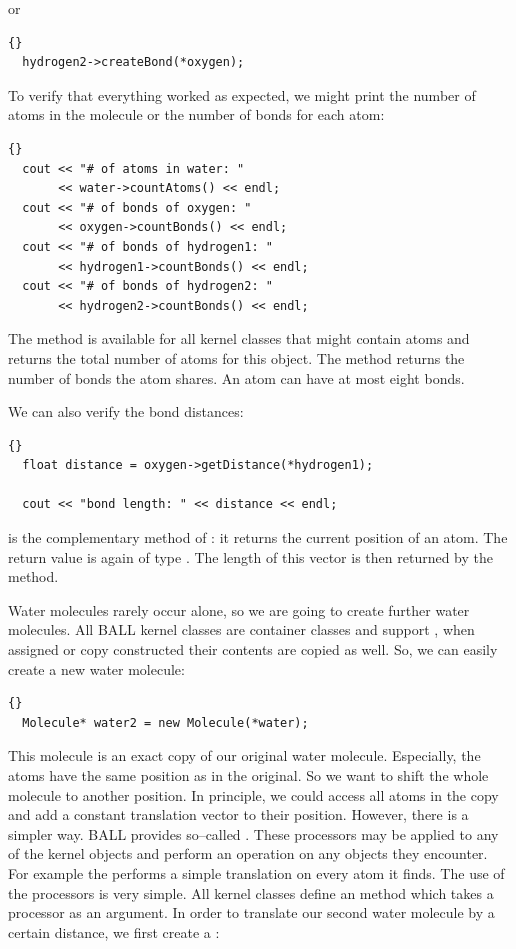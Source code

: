 or

\begin{lstlisting}{}
  hydrogen2->createBond(*oxygen);
\end{lstlisting}

\noindent
To verify that everything worked as expected, we might print the number of
atoms in the molecule or the number of bonds for each atom:
	
\begin{lstlisting}{}
  cout << "# of atoms in water: " 
       << water->countAtoms() << endl;
  cout << "# of bonds of oxygen: " 
       << oxygen->countBonds() << endl;
  cout << "# of bonds of hydrogen1: " 
       << hydrogen1->countBonds() << endl;
  cout << "# of bonds of hydrogen2: " 
       << hydrogen2->countBonds() << endl;
\end{lstlisting}

\noindent
The method  is available for all kernel classes that might
contain atoms and returns the total number of atoms for this object. The
method  returns the number of bonds the atom shares. An
atom can have at most eight bonds.

We can also verify the bond distances:
\begin{lstlisting}{}
  float distance = oxygen->getDistance(*hydrogen1);

  cout << "bond length: " << distance << endl;
\end{lstlisting}
	
\noindent
{} is the complementary method of : it
returns the current position of an atom. The return value is again of type
. The length of this vector is then returned by the
 method. 

Water molecules rarely occur alone, so we are going to create further water molecules.
All BALL kernel classes are container classes and support , \ie when assigned or copy constructed their contents are copied as
well. So, we can easily create a new water molecule:

\begin{lstlisting}{}
  Molecule* water2 = new Molecule(*water);
\end{lstlisting}
	
\noindent
This molecule is an exact copy of our original water molecule. Especially, the
atoms have the same position as in the original. So we want to shift the whole
molecule to another position.  In principle, we could access all atoms in the
copy and add a constant translation vector to their position. However, there
is a simpler way. BALL provides so--called . These
processors may be applied to any of the kernel objects and perform an
operation on any objects they encounter. For example the
 performs a simple translation on every atom it
finds. The use of the processors is very simple.  All kernel classes define an
 method which takes a processor as an argument. In order to
translate our second water molecule by a certain distance, we first create a
:

